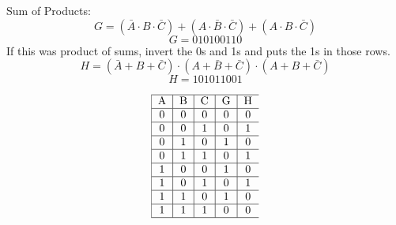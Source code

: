 \documentclass[12pt]{article}
\begin{document}

Sum of Products: 
$$ G = (\bar{A} \cdot B \cdot \bar{C}) + (A \cdot \bar{B} \cdot \bar{C}) + (A \cdot B \cdot \bar{C}) $$
$$ G = 010 100 110$$
If this was product of sums, invert the 0s and 1s and puts the 1s in those rows. 
$$ H = (\bar{A} + B + \bar{C}) \cdot (A + \bar{B} + \bar{C}) \cdot (A + B + \bar{C}) $$ 
$$ H = 101 011 001 $$ 

$$ \begin{tabular}{|c|c|c|c|cl} \hline 
A&B&C&G& H \\ \hline  
0&0&0&0&0 \\ \hline 
0&0&1&0&1 \\ \hline
0&1&0&1&0 \\ \hline
0&1&1&0&1 \\ \hline 
1&0&0&1&0 \\ \hline
1&0&1&0&1 \\ \hline
1&1&0&1&0 \\ \hline
1&1&1&0&0 \\ \hline \end{tabular} $$ 
\end{document}
